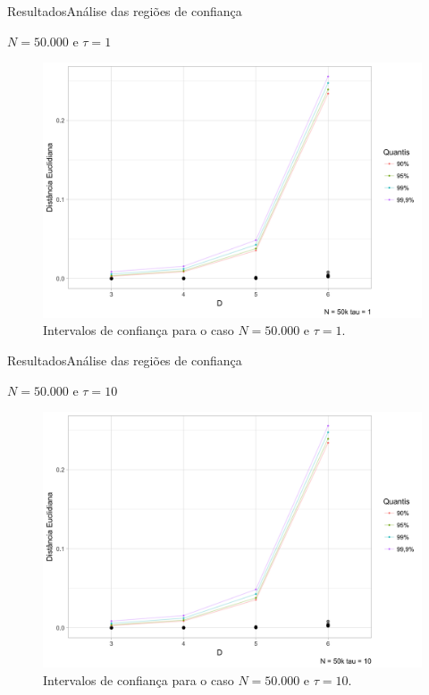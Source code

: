 \documentclass[10pt,xcolor={dvipsnames}]{beamer}
\begin{document}

\begin{frame}{Resultados}{Análise das regiões de confiança}
	\begin{block}{$N=50.000$ e $\tau=1$}
	\begin{figure}
		\centering
		\includegraphics[width=.7\linewidth]{Conf_Int_50k_T1_noMT}
		\caption{Intervalos de confiança para o caso $N=50.000$ e $\tau=1$.}\label{Fig:Conf_Int_50k_T1}
	\end{figure}	
	\end{block}
\end{frame}

\begin{frame}{Resultados}{Análise das regiões de confiança}
	\begin{block}{$N=50.000$ e $\tau=10$}
		\begin{figure}
		\centering
		\includegraphics[width=.7\linewidth]{Conf_Int_50k_T10_noMT}
		\caption{Intervalos de confiança para o caso $N=50.000$ e $\tau=10$.}\label{Fig:Conf_Int_50k_T10}
		\end{figure}
		
	\end{block}
\end{frame}
\end{document}
